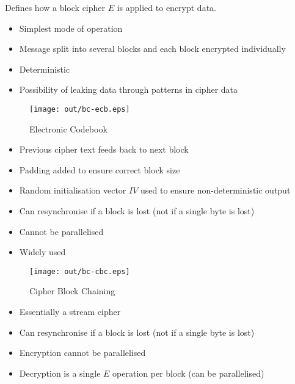 \documentclass[a4paper]{article}
\begin{document}
Defines how a block cipher $E$ is applied to encrypt data.


\begin{itemize}
  \item Simplest mode of operation
  \item Message split into several blocks and each block encrypted individually
  \item Deterministic
  \item Possibility of leaking data through patterns in cipher data
\end{itemize}

\begin{figure}[h!]
  \centering
  \texttt{[image: out/bc-ecb.eps]}
  \caption{Electronic Codebook}
  \label{fig:bc-ecb}
\end{figure}
\FloatBarrier


\begin{itemize}
  \item Previous cipher text feeds back to next block
  \item Padding added to ensure correct block size
  \item Random initialisation vector $IV$ used to ensure non-deterministic
        output
  \item Can resynchronise if a block is lost (not if a single byte is lost)
  \item Cannot be parallelised
  \item Widely used
\end{itemize}

\begin{figure}[h!]
  \centering
  \texttt{[image: out/bc-cbc.eps]}
  \caption{Cipher Block Chaining}
  \label{fig:bc-cbc}
\end{figure}
\FloatBarrier


\begin{itemize}
  \item Essentially a stream cipher
  \item Can resynchronise if a block is lost (not if a single byte is lost)
  \item Encryption cannot be parallelised
  \item Decryption is a single $E$ operation per block (can be parallelised)
\end{itemize}
\end{document}
